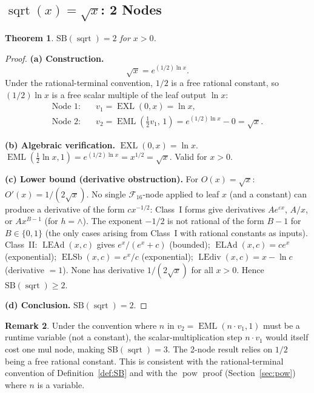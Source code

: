 \documentclass[12pt,a4paper]{article}
\newtheorem{theorem}{Theorem}[section]
\theoremstyle{definition}
\newtheorem{remark}[theorem]{Remark}
\newcommand{\EML}{\operatorname{EML}}
\newcommand{\EXL}{\operatorname{EXL}}
\newcommand{\ELAd}{\operatorname{ELAd}}
\newcommand{\ELSb}{\operatorname{ELSb}}
\newcommand{\LEAd}{\operatorname{LEAd}}
\newcommand{\LEdiv}{\operatorname{LEdiv}}
\newcommand{\powop}{\operatorname{pow}}
\newcommand{\sqrtop}{\operatorname{sqrt}}
\newcommand{\SB}{\mathrm{SB}}
\newcommand{\F}{\mathcal{F}_{16}}
\begin{document}
\subsection{\texorpdfstring{$\sqrtop(x) = \sqrt{x}$}{sqrt(x)}: 2 Nodes}
\label{sec:sqrt}

\begin{theorem}
\label{thm:sqrt}
$\SB(\sqrtop) = 2$ for $x > 0$.
\end{theorem}

\begin{proof}
\textbf{(a) Construction.}
\[
  \sqrt{x} = e^{(1/2)\ln x}.
\]
Under the rational-terminal convention, $1/2$ is a free rational constant,
so $(1/2)\ln x$ is a free scalar multiple of the leaf output $\ln x$:
\begin{align*}
  \text{Node 1:} &\quad v_1 = \EXL(0,x) = \ln x, \\
  \text{Node 2:} &\quad v_2 = \EML\!\left(\tfrac{1}{2} v_1,\,1\right)
    = e^{(1/2)\ln x} - 0 = \sqrt{x}.
\end{align*}

\textbf{(b) Algebraic verification.}
$\EXL(0,x) = \ln x$.
$\EML\!\left(\tfrac{1}{2}\ln x, 1\right) = e^{(1/2)\ln x} = x^{1/2} = \sqrt{x}$.
Valid for $x > 0$.

\textbf{(c) Lower bound (derivative obstruction).}
For $O(x) = \sqrt{x}$: $O'(x) = 1/(2\sqrt{x})$.
No single $\F$-node applied to leaf $x$ (and a constant) can produce a derivative
of the form $cx^{-1/2}$:
Class~I forms give derivatives $Ae^{\varepsilon x}$, $A/x$, or $Ax^{B-1}$ (for $h = \wedge$).
The exponent $-1/2$ is not rational of the form $B - 1$ for $B \in \{0,1\}$
(the only cases arising from Class~I with rational constants as inputs).
Class~II: $\LEAd(x,c)$ gives $e^x/(e^x + c)$ (bounded); $\ELAd(x,c) = ce^x$ (exponential);
$\ELSb(x,c) = e^x/c$ (exponential); $\LEdiv(x,c) = x - \ln c$ (derivative $= 1$).
None has derivative $1/(2\sqrt{x})$ for all $x > 0$.
Hence $\SB(\sqrtop) \ge 2$.

\textbf{(d) Conclusion.} $\SB(\sqrtop) = 2$.
\end{proof}

\begin{remark}
Under the convention where $n$ in $v_2 = \EML(n \cdot v_1, 1)$ must be a runtime
variable (not a constant), the scalar-multiplication step $n \cdot v_1$ would itself
cost one mul node, making $\SB(\sqrtop) = 3$.
The 2-node result relies on $1/2$ being a free rational constant.
This is consistent with the rational-terminal convention of Definition~\ref{def:SB}
and with the $\powop$ proof (Section~\ref{sec:pow}) where $n$ is a variable.
\end{remark}
\end{document}
